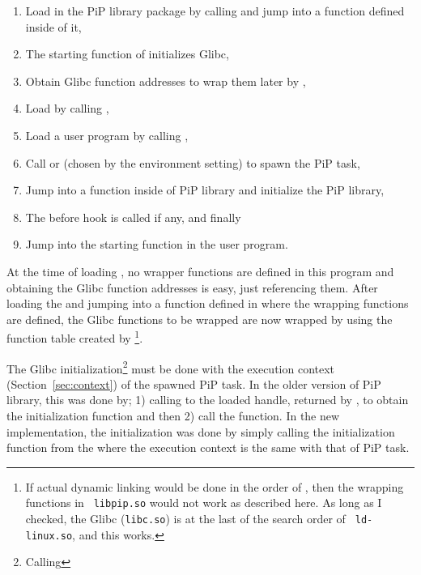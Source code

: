 \begin{enumerate}
\item Load  in the PiP library package by calling
   and jump into a function defined inside of it,
\item The starting function of  initializes Glibc,
\item Obtain Glibc function addresses to wrap them later by
  ,
\item Load  by calling ,
\item Load a user program by calling ,
\item Call  or  (chosen
  by the  environment setting) to spawn the PiP task, 
\item Jump into a function inside of PiP library and initialize the
  PiP library, 
\item The before hook is called if any, and finally
\item Jump into the starting function in the user program.
\end{enumerate}

At the time of loading , no wrapper functions are
defined in this program and obtaining the Glibc function addresses is
easy, just referencing them. After loading the  and
jumping into a function defined in  where the
wrapping functions are defined, the Glibc functions to be wrapped are
now wrapped by using the function table created by
\footnote{If actual dynamic linking would be done in
the order of , then the wrapping functions in {\tt 
  libpip.so} would not work as described here. As long as I checked,
the Glibc ({\tt libc.so}) is at the last of the search order of {\tt
  ld-linux.so}, and this works.}.

The Glibc initialization\footnote{Calling } must
be done with the execution context (Section~\ref{sec:context}) of the
  spawned PiP task. In the older version of PiP library, this was done
  by; 1) calling  to the loaded handle, returned by
  , to obtain the initialization function 
and then 2) call the function. In the new implementation, the
initialization was done by simply calling the initialization function
from the  where the execution context is the same
with that of PiP task. 


